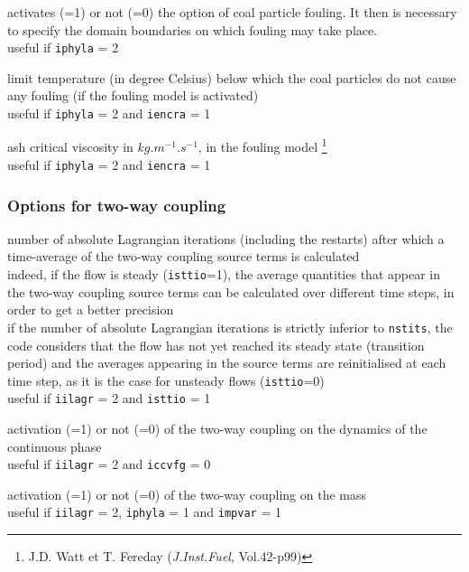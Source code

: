 {activates (=1) or not (=0) the option of coal particle
fouling. It then is necessary to specify the domain boundaries
on which fouling may take place.\\
useful if \texttt{iphyla} = 2}

{limit temperature (in degree Celsius) below which the coal particles do
not cause any fouling (if the fouling model is activated)\\
useful if \texttt{iphyla} = 2 and \texttt{iencra} = 1}

{ash critical viscosity in $kg.m^{-1}.s^{-1}$, in the fouling model
\footnote{J.D. Watt
et T. Fereday (\textit{J.Inst.Fuel}, Vol.42-p99)}\\
useful if \texttt{iphyla} = 2 and \texttt{iencra} = 1}

\subsubsection{Options for two-way coupling}

{number of absolute Lagrangian iterations (including the restarts)
after which a time-average of the two-way coupling source terms is
calculated\\
indeed, if the flow is steady (\texttt{isttio}=1), the average quantities
that appear in the two-way coupling source terms can be calculated over
different time steps, in order to get a better precision\\
if the number of absolute Lagrangian iterations is strictly inferior to
\texttt{nstits}, the code considers that the flow has not yet reached its
steady state (transition period) and the averages appearing in the source
terms are reinitialised at each time step, as it is the case for unsteady
flows (\texttt{isttio}=0)\\
useful if \texttt{iilagr} = 2 and \texttt{isttio} = 1}

{activation (=1) or not (=0) of the two-way coupling on the dynamics of the
continuous phase\\
useful if \texttt{iilagr} = 2 and \texttt{iccvfg} = 0}

{activation (=1) or not (=0) of the two-way coupling on the mass\\
useful if \texttt{iilagr} = 2, \texttt{iphyla} = 1 and \texttt{impvar} = 1}

